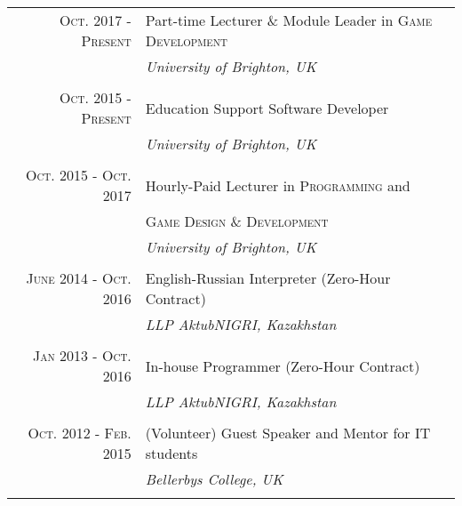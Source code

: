 \documentclass[a4paper,10pt]{article} %
\begin{document}
\begin{tabular}{r|p{11cm}}

\textsc{Oct. 2017 - Present} & Part-time Lecturer \& Module Leader in \textsc{Game Development}\\
& \emph{University of Brighton, UK}\\
\multicolumn{2}{c}{} \\

\textsc{Oct. 2015 - Present} & Education Support Software Developer \\
& \emph{University of Brighton, UK}\\
\multicolumn{2}{c}{} \\


\textsc{Oct. 2015 - Oct. 2017} & Hourly-Paid Lecturer in \textsc{Programming} and\\
& \textsc{Game Design \& Development}\\
& \emph{University of Brighton, UK}\\
\multicolumn{2}{c}{} \\


\textsc{June 2014 - Oct. 2016} & English-Russian Interpreter (Zero-Hour Contract)\\
& \emph{LLP AktubNIGRI, Kazakhstan}\\
\multicolumn{2}{c}{} \\


\textsc{Jan 2013 - Oct. 2016} & In-house Programmer (Zero-Hour Contract)\\
& \emph{LLP AktubNIGRI, Kazakhstan}\\
\multicolumn{2}{c}{} \\


\textsc{Oct. 2012 - Feb. 2015} & (Volunteer) Guest Speaker and Mentor for IT students\\
& \emph{Bellerbys College, UK}\\
\multicolumn{2}{c}{} \\

\end{tabular}
\vspace{0.1cm}

\end{document}
